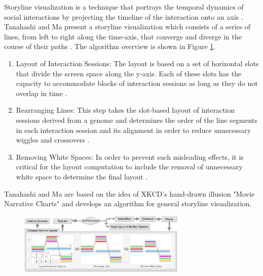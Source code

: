 \documentclass{egpubl}
\begin{document}
Storyline visualization is a technique that portrays the temporal dynamics of social interactions by projecting the timeline of the interaction onto an axis \cite{Tanahashi}.
Tanahashi and Ma present a storyline visualization which consists of a series of lines, from left to
right along the time-axis, that converge and diverge in the course of their paths \cite{Tanahashi}.
The algorithm overview is shown in Figure \ref{fig:Tanahashi2012}.
\begin{enumerate}
\item Layout of Interaction Sessions: The layout is based on a set of horizontal slots that divide the screen space along the y-axis. Each of these slots has the capacity to accommodate blocks of interaction sessions as long as they do not overlap in time \cite{Tanahashi}.
\item Rearranging Lines: This step takes the slot-based layout of interaction sessions derived from a genome and determines the order of the line segments in each interaction session and its alignment in order to reduce unnecessary wiggles and crossovers \cite{Tanahashi}.
\item Removing White Spaces: In order to prevent such misleading effects, it is critical for the layout computation to include the removal of unnecessary white space to determine the final layout \cite{Tanahashi}.
\end{enumerate}
Tanahashi and Ma \cite{Tanahashi} are based on the idea of XKCD's hand-drawn illusion "Movie Narrative Charts" \cite{Ogievetsky2009} and develops an algorithm for general storyline visualization.
\begin{figure}
\begingroup
\centering
\includegraphics[width=8cm]{./images/Tanahashi2012}
\label{fig:Tanahashi2012}
\endgroup
\end{figure}
\end{document}
